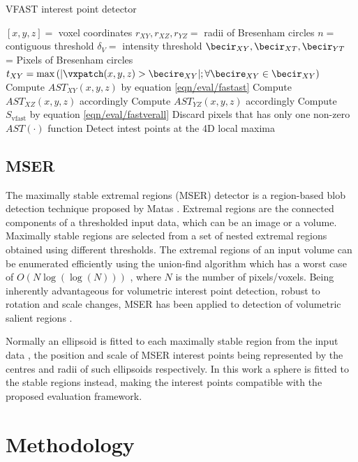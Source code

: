 \begin{algorithm}
\caption{VFAST interest point detector}
\label{algo/eval/vfast}
\begin{algorithmic}
	\REQUIRE $[x,y,z] = $ voxel coordinates
	\REQUIRE $r_{XY},r_{XZ},r_{YZ} = $ radii of Bresenham circles
	\REQUIRE $n = $ contiguous threshold
	\REQUIRE $\delta_{V} = $ intensity threshold
	\STATE $\becir_{XY},\becir_{XT},\becir_{YT}$ = Pixels of Bresenham circles
	\STATE $t_{XY} = \max\left(| \vxpatch(x,y,z) > \becire_{XY}|; \forall \becire_{XY} \in \becir_{XY} \right)$
	\STATE Compute $AST_{XY}(x,y,z)$ by equation \ref{eqn/eval/fastast}
	\STATE Compute $AST_{XZ}(x,y,z)$ accordingly 
	\STATE Compute $AST_{YZ}(x,y,z)$ accordingly 
	\STATE Compute $S_\textrm{vfast}$ by equation \ref{eqn/eval/fastverall}
	\STATE Discard pixels that has only one non-zero $AST(\cdot)$ function 
	\STATE Detect intest points at the 4D local maxima 
\end{algorithmic}
\end{algorithm}

\subsection{MSER}
The maximally stable extremal regions (MSER) detector is a region-based blob detection technique proposed by Matas \etal \cite{Matas2004}. Extremal regions are the connected components of a thresholded input data, which can be an image or a volume. Maximally stable regions are selected from a set of nested extremal regions obtained using different thresholds. The extremal regions of an input volume can be enumerated efficiently using the union-find algorithm which has a worst case of $O(N\log(\log(N)))$ \cite{Matas2004}, where $N$ is the number of pixels/voxels. Being inherently advantageous for volumetric interest point detection, \ie robust to rotation and scale changes, MSER has been applied to detection of volumetric salient regions \cite{Donoser2006,Riemenschneider2009}.

Normally an ellipsoid is fitted to each maximally stable region from the input data \cite{Matas2004}, the position and scale of MSER interest points being represented by the centres and radii of such ellipsoids respectively. In this work a sphere is fitted to the stable regions instead, making the interest points compatible with the proposed evaluation framework.

\section{Methodology}
\label{sec/eval/methodology}

